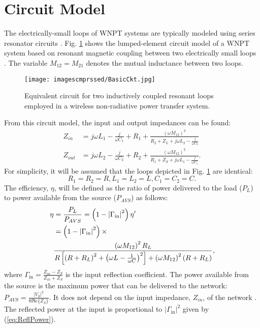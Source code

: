\documentclass[journal]{IEEEtran}
\begin{document}
\section{Circuit Model}
\label{sec:CircuitModel}

The electrically-small loops of WNPT systems are typically modeled using series resonator circuits \cite{FundamentalWNPT}. Fig. \ref{fig:BasicCkt} shows the lumped-element circuit model of a WNPT system based on resonant magnetic coupling between two electrically small loops \cite{Thomas, Thomas2}. The variable $M_{12}=M_{21}$ denotes the mutual inductance between two loops.
\begin{figure}[htbp]
    \centering
    \texttt{[image: imagescmprssed/BasicCkt.jpg]}
    \caption{Equivalent circuit for two  inductively coupled resonant loops employed in a wireless non-radiative power transfer system.}
    \label{fig:BasicCkt}
\end{figure}

From this circuit model, the input and output impedances can be found:
\begin{align}
Z_{in}&=j\omega L_1-\frac{j}{\omega C_1} + R_1+\frac{\left(\omega M_{12}\right)^2}{R_2+Z_L+j\omega L_2-\frac{j}{\omega C_2}}
\label{eq:Zin} \\
Z_{out}&=j\omega L_2-\frac{j}{\omega C_2}+R_2+\frac{\left(\omega M_{12}\right)^2}{R_1+Z_S+j\omega L_1-\frac{j}{\omega C_1}}.
\label{eq:Zout}
\end{align}
For simplicity, it will be assumed that the loops depicted in Fig. \ref{fig:BasicCkt} are identical:
\begin{equation}
R_1=R_2=R, L_1=L_2=L, C_1=C_2=C.
\label{eq: identicl}
\end{equation}
The efficiency, $\eta$, will be defined as the ratio of power delivered to the load ($P_L$) to power available from the source ($P_{AVS}$) as follows:
\begin{align}
\eta &= \frac{P_{L}}{P_{AVS}} = \left(1-\left|\Gamma_{\mathrm{in}}\right|^2\right) \eta' \label{eq:Efficiency2a} \\
 &= \left(1-\left|\Gamma_{\mathrm{in}}\right|^2\right) \times \notag \\
 &\frac{ \left(\omega M_{12}\right)^2 R_L}{ R \left[\left(R + R_L\right)^2 + \left(\omega L - \frac{1}{\omega C}\right)^2\right] + \left(\omega M_{12}\right)^2 (R + R_L)}, \label{eq:Efficiency2}
\end{align} where $\Gamma_{\mathrm{in}}=\frac{Z_{in}-Z_S}{Z_{in}+Z_S}$ is the input reflection coefficient. The power available from the source is the maximum power that can be delivered to the network: $P_{AVS} = \frac{|V_S|^2}{8 \Re e\{{Z_{S}}\}}$. It does not depend on the input impedance, $Z_{in}$, of the network \cite{Gonz}. The reflected power at the input is proportional to $\left|\Gamma_{\mathrm{in}}\right|^2$ given by (\ref{eq:ReflPower}).
\end{document}
